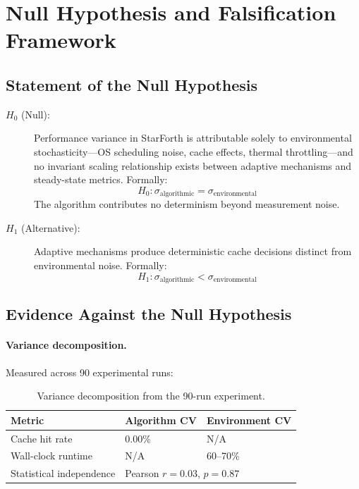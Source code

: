 
\section{Null Hypothesis and Falsification Framework}
\label{sec:null-hypothesis}

\subsection{Statement of the Null Hypothesis}

\begin{description}
  \item[$H_0$ (Null):] Performance variance in StarForth is attributable
    solely to environmental stochasticity---OS scheduling noise, cache
    effects, thermal throttling---and no invariant scaling relationship
    exists between adaptive mechanisms and steady-state metrics. Formally:
    \[
      H_0\colon \sigma_{\text{algorithmic}} = \sigma_{\text{environmental}}
    \]
    The algorithm contributes no determinism beyond measurement noise.

  \item[$H_1$ (Alternative):] Adaptive mechanisms produce deterministic
    cache decisions distinct from environmental noise. Formally:
    \[
      H_1\colon \sigma_{\text{algorithmic}} < \sigma_{\text{environmental}}
    \]
\end{description}

\subsection{Evidence Against the Null Hypothesis}

\paragraph{Variance decomposition.}
Measured across 90 experimental runs:

\begin{table}[h]
\centering
\caption{Variance decomposition from the 90-run experiment.}
\begin{tabular}{lll}
\toprule
\textbf{Metric} & \textbf{Algorithm CV} & \textbf{Environment CV} \\
\midrule
Cache hit rate & 0.00\% & N/A \\
Wall-clock runtime & N/A & 60--70\% \\
Statistical independence & \multicolumn{2}{l}{Pearson $r = 0.03$, $p = 0.87$} \\
\bottomrule
\end{tabular}
\end{table}

